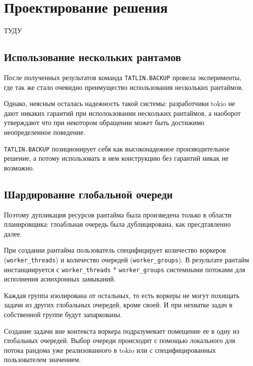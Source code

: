 
\section{Проектирование решения}

ТУДУ

\subsection{Использование нескольких рантамов}

После полученных результатов команда \verb|TATLIN.BACKUP| провела эксперименты, где так же стало очевидно преимущество использования нескольких рантаймов.

Однако, неясным осталась надежность такой системы: разработчики tokio не дают никаких гарантий при исполоьзовании нескольких рантаймов, а наоборот утверждают что при некотором обращении может быть достижимо неопределенное поведение.

\verb|TATLIN.BACKUP| позиционирует себя как высоконадежное производительное решение, а потому использовать в нем конструкцию без гарантий никак не возможно.

\subsection{Шардирование глобальной очереди}

Поэтому дупликация ресурсов рантайма была произведена только в области планировщика: глоабльная очередь была дублицирована, как пресдтавленно далее. %


При создании рантайма пользователь специфицирует количество воркеров (\verb|worker_threads|) и количество очередей (\verb|worker_groups|). В результате рантайм инстанциируется с \verb|worker_threads| * \verb|worker_groups| системными потоками для исполнения асинхронных замыканий.

Каждая группа изолирована от остальных, то есть воркеры не могут похищать задачи из других глобальных очередей, кроме своей. И при нехватке задач в собственной группе будут запаркованы.

Создание задачи вне контекста воркера подразумевает помещение ее в одну из глобальных очередей. Выбор очереди происходит с помощью локального для потока рандома уже реализованного в tokio или с специфицированных пользователем значением.

